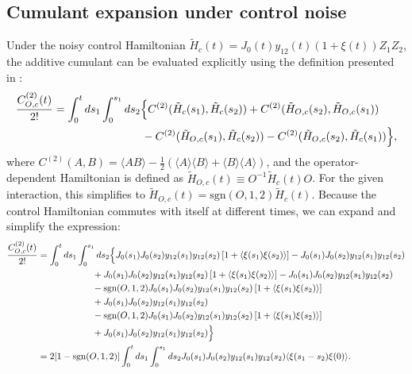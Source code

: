\documentclass[%
 reprint,
superscriptaddress,
 amsmath,amssymb,
 aps,
pra,
]{revtex4-2}
\begin{document}
\appendix
\begin{widetext}
\section{Cumulant expansion under control noise}
\label{app::controlnoiseCE}
Under the noisy control Hamiltonian $\tilde{H}_c(t)=J_0(t)y_{12}(t)\left(1+\xi(t)\right)Z_1Z_2$, the additive cumulant can be evaluated explicitly using the definition presented in \cite{CombMultiaxis}:
\begin{align}
    \frac{C_{O,c}^{(2)}(t)}{2!}&=\int_0^t ds_1\int_0^{s_1} ds_2\Big\{C^{(2)}(\tilde{H}_c(s_1),\tilde{H}_c(s_2))+C^{(2)}(\tilde{H}_{O,c}(s_2),\tilde{H}_{O,c}(s_1)) \notag\\
    &\qquad\qquad\qquad\qquad-C^{(2)}(\tilde{H}_{O,c}(s_1),\tilde{H}_{c}(s_2))-C^{(2)}(\tilde{H}_{O,c}(s_2),\tilde{H}_{c}(s_1))\Big\},
\end{align}
where $C^{(2)}(A,B)=\langle AB \rangle-\tfrac{1}{2}(\langle A \rangle\langle B \rangle+\langle B \rangle\langle A \rangle)$, and the operator-dependent Hamiltonian is defined as $\tilde{H}_{O,c}(t)\equiv O^{-1}\tilde{H}_{c}(t)O$. For the given interaction, this simplifies to $\tilde{H}_{O,c}(t)=\text{sgn}(O,1,2)\tilde{H}_c(t)$. Because the control Hamiltonian commutes with itself at different times, we can expand and simplify the expression:
\begin{align}
    \frac{C_{O,c}^{(2)}(t)}{2!}&=\int_0^t ds_1\int_0^{s_1}ds_2\Big\{J_0(s_1)J_0(s_2)y_{12}(s_1)y_{12}(s_2)\left[1+\langle \xi(s_1)\xi(s_2)\rangle\right] - J_0(s_1)J_0(s_2)y_{12}(s_1)y_{12}(s_2)\notag\\
    &\qquad\qquad\qquad +J_0(s_1)J_0(s_2)y_{12}(s_1)y_{12}(s_2)\left[1+\langle \xi(s_1)\xi(s_2)\rangle\right] - J_0(s_1)J_0(s_2)y_{12}(s_1)y_{12}(s_2)\notag\\
    &\qquad\qquad\qquad -\text{sgn}(O,1,2)J_0(s_1)J_0(s_2)y_{12}(s_1)y_{12}(s_2)\left[1+\langle \xi(s_1)\xi(s_2)\rangle\right] \notag\\
    &\qquad\qquad\qquad+ J_0(s_1)J_0(s_2)y_{12}(s_1)y_{12}(s_2)\notag\\
    &\qquad\qquad\qquad-\text{sgn}(O,1,2)J_0(s_1)J_0(s_2)y_{12}(s_1)y_{12}(s_2)\left[1+\langle \xi(s_1)\xi(s_2)\rangle\right] \notag\\
    &\qquad\qquad\qquad+ J_0(s_1)J_0(s_2)y_{12}(s_1)y_{12}(s_2)\Big\}\notag\\
    &=2[1-\text{sgn}(O,1,2)]\int_0^t ds_1 \int_0^{s_1}ds_2 J_0(s_1)J_0(s_2)y_{12}(s_1)y_{12}(s_2)\langle \xi(s_1-s_2)\xi(0)\rangle.

\end{align}
\end{widetext}
\end{document}

